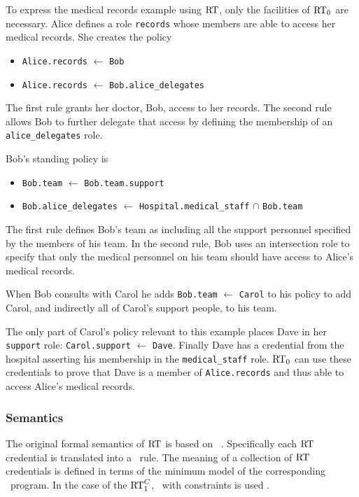To express the medical records example using $\text{RT}$, only the
facilities of $\text{RT}_0$ are necessary. Alice defines a role
\texttt{records} whose members are able to access her medical
records. She creates the policy
\begin{itemize}
\item \texttt{Alice.records} $\leftarrow$ \texttt{Bob}
\item \texttt{Alice.records} $\leftarrow$ \texttt{Bob.alice\_delegates}
\end{itemize}
The first rule grants her doctor, Bob, access to her records. The second
rule allows Bob to further delegate that access by defining the membership
of an \texttt{alice\_delegates} role.

Bob's standing policy is
\begin{itemize}
\item \texttt{Bob.team} $\leftarrow$ \texttt{Bob.team.support}
\item \texttt{Bob.alice\_delegates} $\leftarrow$
  \texttt{Hospital.medical\_staff} $\cap$ \texttt{Bob.team}
\end{itemize}
The first rule defines Bob's team as including all the support personnel
specified by the members of his team. In the second rule, Bob uses an
intersection role to specify that only the medical personnel on his team
should have access to Alice's medical records.

When Bob consults with Carol he adds \texttt{Bob.team} $\leftarrow$
\texttt{Carol} to his policy to add Carol, and indirectly all of Carol's
support people, to his team.

The only part of Carol's policy relevant to this example places Dave in her
\texttt{support} role: \texttt{Carol.support} $\leftarrow$ \texttt{Dave}.
Finally Dave has a credential from the hospital asserting his membership in
the \texttt{medical\_staff} role. $\text{RT}_0$ can use these credentials to
prove that Dave is a member of \texttt{Alice.records} and thus able to
access Alice's medical records.

\subsubsection{Semantics}

The original formal semantics of $\text{RT}$ is based on \datalog\ \cite{Li:DRBTMF}.
Specifically each $\text{RT}$ credential is translated into a \datalog\ rule. The
meaning of a collection of $\text{RT}$ credentials is defined in terms of the
minimum model of the corresponding \datalog\ program. In the case of the
$\text{RT}_1^C$, \datalog\ with constraints is used \cite{Li:DCFTML}.

